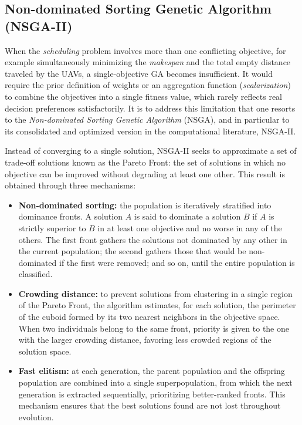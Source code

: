\subsection{Non-dominated Sorting Genetic Algorithm (NSGA-II)}

When the \textit{scheduling} problem involves more than one conflicting objective, for example simultaneously minimizing the \textit{makespan} and the total empty distance traveled by the UAVs, a single-objective GA becomes insufficient. It would require the prior definition of weights or an aggregation function (\textit{scalarization}) to combine the objectives into a single fitness value, which rarely reflects real decision preferences satisfactorily. It is to address this limitation that one resorts to the \textit{Non-dominated Sorting Genetic Algorithm} (NSGA), and in particular to its consolidated and optimized version in the computational literature, NSGA-II.

Instead of converging to a single solution, NSGA-II seeks to approximate a set of trade-off solutions known as the Pareto Front: the set of solutions in which no objective can be improved without degrading at least one other. This result is obtained through three mechanisms:

\begin{itemize}
    \item \textbf{Non-dominated sorting:} the population is iteratively stratified into dominance fronts. A solution $A$ is said to dominate a solution $B$ if $A$ is strictly superior to $B$ in at least one objective and no worse in any of the others. The first front gathers the solutions not dominated by any other in the current population; the second gathers those that would be non-dominated if the first were removed; and so on, until the entire population is classified.
    \item \textbf{Crowding distance:} to prevent solutions from clustering in a single region of the Pareto Front, the algorithm estimates, for each solution, the perimeter of the cuboid formed by its two nearest neighbors in the objective space. When two individuals belong to the same front, priority is given to the one with the larger crowding distance, favoring less crowded regions of the solution space.
    \item \textbf{Fast elitism:} at each generation, the parent population and the offspring population are combined into a single superpopulation, from which the next generation is extracted sequentially, prioritizing better-ranked fronts. This mechanism ensures that the best solutions found are not lost throughout evolution.
\end{itemize}

